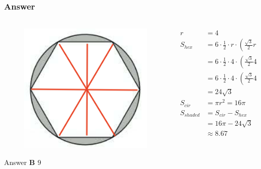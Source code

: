 \documentclass[
	11pt, %
]{beamer}
\begin{document}

\begin{frame}
	\frametitle{Answer}
	\framesubtitle{}
	\begin{columns}[t] 
		\begin{column}{0.3\textwidth} %
			\begin{figure}
				\includegraphics[width=\linewidth]{Hexagon_Triangle_Example_Question1_1.png}
			\end{figure}
			\pause
			Answer \textbf{B $9$}		
		\end{column}
		\begin{column}{0.7\textwidth} %
			\pause
	     \begin{equation*}
					\begin{aligned}
					r       &= 4\\
					S_{hex} &= 6 \cdot\frac{1}{2}\cdot r\cdot (\frac{\sqrt{3}}{2}r)\\
					        &= 6\cdot\frac{1}{2} \cdot4\cdot (\frac{\sqrt{3}}{2}4)\\
					        &= 6\cdot\frac{1}{2} \cdot4\cdot(\frac{\sqrt{3}}{2}4)\\
					        &= 24\sqrt{3}\\
					S_{cir} &= \pi r^2 = 16 \pi\\
					S_{shaded} &= S_{cir} - S_{hex}\\
					           &= 16 \pi -24\sqrt{3}\\
					           &\approx 8.67
					\end{aligned}
				\end{equation*}					
		\end{column}
	\end{columns}
\end{frame}
\end{document}
